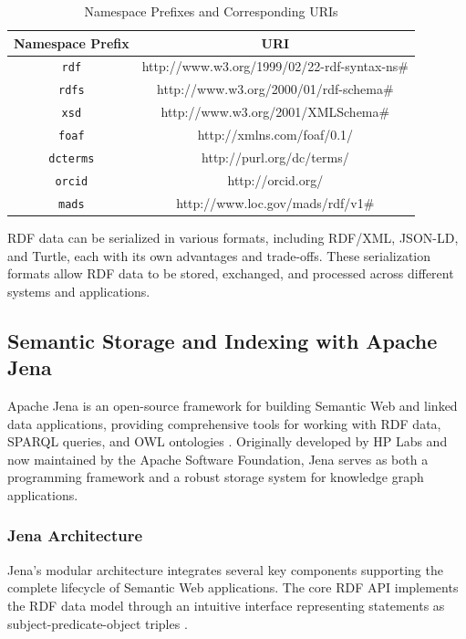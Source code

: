 \begin{table}
    \centering
    \caption{Namespace Prefixes and Corresponding URIs \citep{heardlibrary_serialization}}
    \label{tab:sample-rdf-qname}
    \begin{tabular}{|c|c|}
        \hline
         \textbf{Namespace Prefix} & \textbf{URI} \\
        \hline
         \texttt{rdf} & http://www.w3.org/1999/02/22-rdf-syntax-ns\# \\
         \texttt{rdfs} & http://www.w3.org/2000/01/rdf-schema\# \\
         \texttt{xsd} & http://www.w3.org/2001/XMLSchema\# \\
         \texttt{foaf} & http://xmlns.com/foaf/0.1/ \\
         \texttt{dcterms} & http://purl.org/dc/terms/ \\
         \texttt{orcid} & http://orcid.org/ \\
         \texttt{mads} & http://www.loc.gov/mads/rdf/v1\# \\
        \hline
    \end{tabular}
\end{table}

RDF data can be serialized in various formats, including RDF/XML, JSON-LD, and Turtle, each with its own advantages and trade-offs. These serialization formats allow RDF data to be stored, exchanged, and processed across different systems and applications.
\subsection{Semantic Storage and Indexing with Apache Jena}
Apache Jena is an open-source framework for building Semantic Web and linked data applications, providing comprehensive tools for working with RDF data, SPARQL queries, and OWL ontologies \citep{jena2011apache}. Originally developed by HP Labs and now maintained by the Apache Software Foundation, Jena serves as both a programming framework and a robust storage system for knowledge graph applications.

\subsubsection{Jena Architecture}
Jena's modular architecture integrates several key components supporting the complete lifecycle of Semantic Web applications. The core RDF API implements the RDF data model through an intuitive interface representing statements as subject-predicate-object triples \citep{carroll2004jena}.

